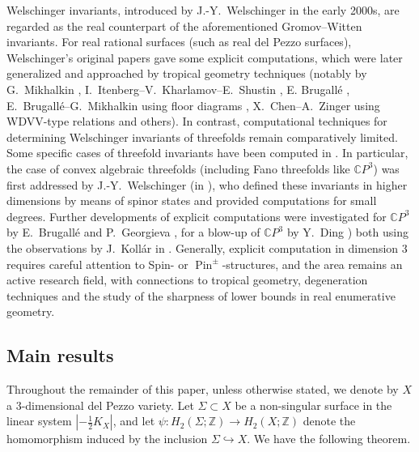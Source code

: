 \documentclass[11pt]{amsart}
\numberwithin{equation}{section}
\theoremstyle{definition}
\theoremstyle{plain}
\theoremstyle{remark}
\DeclareMathOperator{\Pin}{Pin}
\begin{document}
Welschinger invariants, introduced by J.-Y.~Welschinger in the early 2000s, are regarded as the real counterpart of the aforementioned Gromov--Witten invariants. For real rational surfaces (such as real del Pezzo surfaces), Welschinger's original papers \cite{welschinger2005fourfolds,welschinger2005spinor} gave some explicit computations, which were later generalized and approached by tropical geometry techniques (notably by G.~Mikhalkin \cite{mikhalkin2005enumerative}, I.~Itenberg--V.~Kharlamov--E.~Shustin \cite{itenberg2009welschinger}, E. Brugall\'e \cite{brugalle2007enumeration}, E.~Brugall\'e--G.~Mikhalkin using floor di\-a\-grams \cite{brugalle2015floor}, X.~Chen--A.~Zinger using  WDVV-type relations \cite{chen2021wdvv} and others).  In contrast, computational techniques for determining Welschinger invariants of threefolds remain comparatively limited. Some specific cases of threefold invariants have been computed in \cite{brugalle2007enumeration,georgieva2017enumeration,chen2021wdvv}. In particular, the case of convex algebraic threefolds (including Fano threefolds like $\mathbb{C}P^3$) was first addressed by J.-Y.~Welschinger (in \cite{welschinger2005spinor}), who defined these invariants in higher dimensions by means of spinor states and provided computations for small degrees. Further developments of explicit computations  were investigated for $\mathbb{C}P^3$ by E.~Brugall\'e and P.~Georgieva \cite{brugalle2016pencils}, for a blow-up of $\mathbb{C}P^3$ by Y.~Ding \cite{ding2020remark}) both using the observations by J.~Koll\' ar in \cite{kollar2015examples}.  Generally, explicit computation in dimension $3$ requires careful attention to Spin- or $\Pin^\pm$-structures, and the area remains an active research field, with connections to tropical geometry, degeneration techniques and the study of the sharpness of lower bounds in real enumerative geometry.



\subsection{Main results}



Throughout the remainder of this paper, unless otherwise stated, we denote by $X$ a $3$-dimensional del Pezzo variety. Let $\Sigma\subset X$ be a non-singular surface  in the linear system $|-\frac{1}{2}K_X|$, and let $\psi\colon H_2(\Sigma;\mathbb{Z})\rightarrow H_2(X;\mathbb{Z})$ denote the homomorphism induced by the inclusion $\Sigma \hookrightarrow X$. We have the following theorem.
\end{document}
